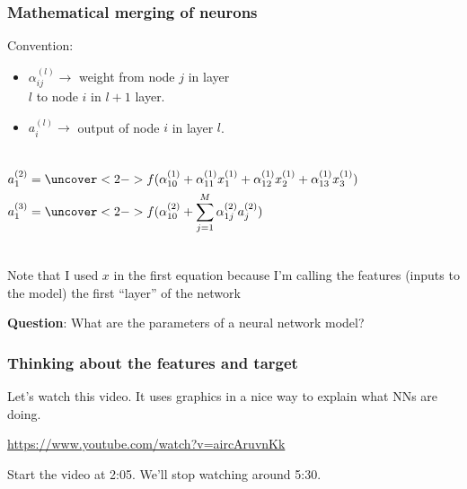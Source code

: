 \documentclass[mathserif, aspectratio=169]{beamer}
\begin{document}
\begin{frame}[t]\frametitle{Mathematical merging of neurons}
    Convention:
    \begin{itemize}
    	\item $\alpha_{ij}^{(l)} \rightarrow$ weight from node $j$ in layer\\ $l$ to node $i$ in $l+1$ layer.
    	\item $a_{i}^{(l)} \rightarrow$ output of node $i$ in layer $l$.
    \end{itemize}

    \begin{columns}
    	    \begin{align*}
		     	a_1^{(2)} &= \uncover<2->{f(\alpha_{10}^{(1)} + \alpha_{11}^{(1)}x_1^{(1)}+\alpha_{12}^{(1)}x_2^{(1)}+\alpha_{13}^{(1)}x_3^{(1)})} \\
		     	a_1^{(3)} &= \uncover<2->{f(\alpha_{10}^{(2)} + \sum_{j=1}^M\alpha_{1j}^{(2)}a_j^{(2)})} \\
		    \end{align*}
    \end{columns}
    Note that I used $x$ in the first equation because I'm calling the features (inputs to the model) the first ``layer'' of the network
	
    \textbf{Question}: What are the parameters of a neural network model?

\end{frame}

\begin{frame}[t]\frametitle{Thinking about the features and target}
    Let's watch this video.  It uses graphics in a nice way to explain what NNs are doing. 
    \vspace{10mm}

    \url{https://www.youtube.com/watch?v=aircAruvnKk}

    \vspace{10mm}

    Start the video at 2:05.  We'll stop watching around 5:30.
\end{frame}
\end{document}
